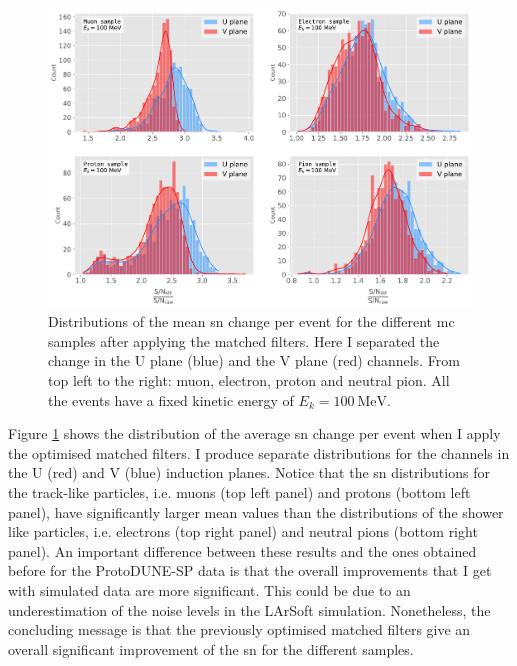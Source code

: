 \begin{figure}[t]
	\centering
	\includegraphics[width=0.9\linewidth]{Images/Matched_Filter/larsoft_sn_hists.pdf}
	\caption[Distributions of the mean \gls{sn} change per event for the different \gls{mc} samples after applying the matched filters.]{Distributions of the mean \gls{sn} change per event for the different \gls{mc} samples after applying the matched filters. Here I separated the change in the U plane (blue) and the V plane (red) channels. From top left to the right: muon, electron, proton and neutral pion. All the events have a fixed kinetic energy of $E_{k} = 100 \ \mathrm{MeV}$.}
	\label{fig:mono_summary_hist}
\end{figure}

Figure \ref{fig:mono_summary_hist} shows the distribution of the average \gls{sn} change per event when I apply the optimised matched filters. I produce separate distributions for the channels in the U (red) and V (blue) induction planes. Notice that the \gls{sn} distributions for the track-like particles, i.e. muons (top left panel) and protons (bottom left panel), have significantly larger mean values than the distributions of the shower like particles, i.e. electrons (top right panel) and neutral pions (bottom right panel). An important difference between these results and the ones obtained before for the ProtoDUNE-SP data is that the overall improvements that I get with simulated data are more significant. This could be due to an underestimation of the noise levels in the LArSoft simulation. Nonetheless, the concluding message is that the previously optimised matched filters give an overall significant improvement of the \gls{sn} for the different samples.

